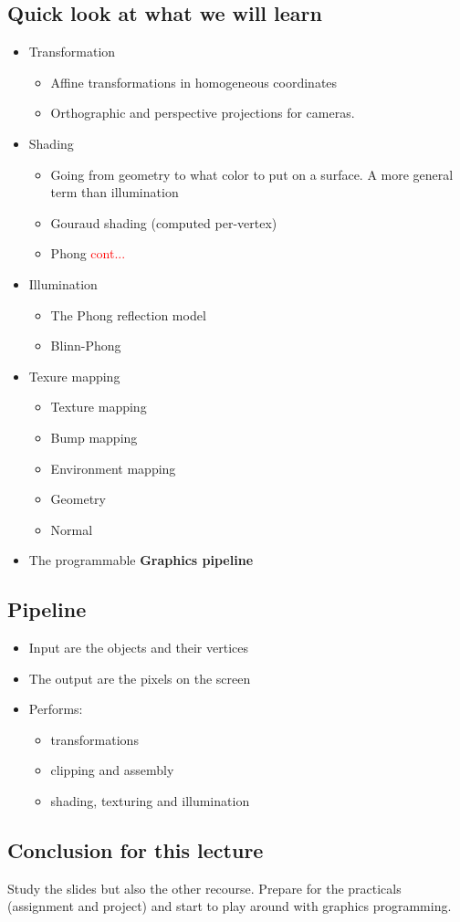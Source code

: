 \subsection*{Quick look at what we will learn}
\begin{itemize}
	\item Transformation
	\begin{itemize}
		\item Affine transformations in homogeneous coordinates
		\item Orthographic and perspective projections for cameras.
	\end{itemize}
	\item Shading
	\begin{itemize}
		\item Going from geometry to what color to put on a surface. A more general term than illumination 
		\item Gouraud shading (computed per-vertex)
		\item Phong \textcolor{red}{cont...} 
	\end{itemize}
	\item Illumination
	\begin{itemize}
		\item The Phong reflection model
		\item Blinn-Phong
	\end{itemize}
	\item Texure mapping
	\begin{itemize}
		\item Texture mapping
		\item Bump mapping
		\item Environment mapping
		\item Geometry
		\item Normal
	\end{itemize}
	\item The programmable \textbf{Graphics pipeline}
\end{itemize}



\subsection*{Pipeline}
\begin{itemize}
	\item Input are the objects and their vertices
	\item The output are the pixels on the screen
	\item Performs:
	\begin{itemize}
		\item transformations
		\item clipping and assembly
		\item shading, texturing and illumination
	\end{itemize}
\end{itemize}

\subsection*{Conclusion for this lecture}
Study the slides but also the other recourse. Prepare for the practicals (assignment and project) and start to play around with graphics programming.   

